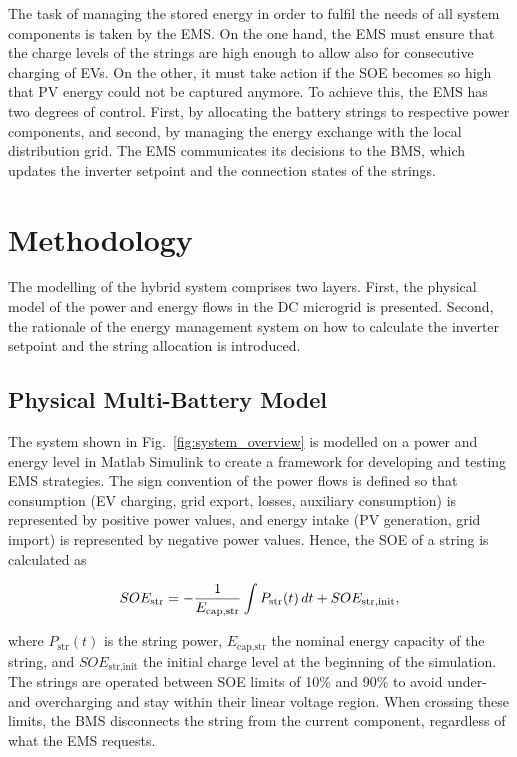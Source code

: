 \documentclass[final,5p,times,twocolumn]{elsarticle}
\begin{document}
The task of managing the stored energy in order to fulfil the needs of all system components is taken by the EMS. On the one hand, the EMS must ensure that the charge levels of the strings are high enough to allow also for consecutive charging of EVs. On the other, it must take action if the SOE becomes so high that PV energy could not be captured anymore. To achieve this, the EMS has two degrees of control. First, by allocating the battery strings to respective power components, and second, by managing the energy exchange with the local distribution grid. The EMS communicates its decisions to the BMS, which updates the inverter setpoint and the connection states of the strings.


\section{Methodology}\label{sec:method}

The modelling of the hybrid system comprises two layers. First, the physical model of the power and energy flows in the DC microgrid is presented. Second, the rationale of the energy management system on how to calculate the inverter setpoint and the string allocation is introduced.


\subsection{Physical Multi-Battery Model}

The system shown in Fig.~\ref{fig:system_overview} is modelled on a power and energy level in Matlab Simulink to create a framework for developing and testing EMS strategies. The sign convention of the power flows is defined so that consumption (EV charging, grid export, losses, auxiliary consumption) is represented by positive power values, and energy intake (PV generation, grid import) is represented by negative power values. Hence, the SOE of a string is calculated as 

\begin{equation}
\small
    SOE_{\text{str}} = -\frac{1}{E_{\text{cap,str}}}\int P_{\text{str}}(t)\,dt + SOE_{\text{str,init}},
\end{equation}

where $P_{\text{str}}(t)$ is the string power, $E_{\text{cap,str}}$ the nominal energy capacity of the string, and $SOE_{\text{str,init}}$ the initial charge level at the beginning of the simulation. The strings are operated between SOE limits of 10\% and 90\% to avoid under- and overcharging and stay within their linear voltage region. When crossing these limits, the BMS disconnects the string from the current component, regardless of what the EMS requests. 
\end{document}
